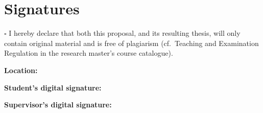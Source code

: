 \documentclass{article}
\begin{document}
\section*{Signatures}

\vspace{1.5em}

\noindent $\square$ I hereby declare that both this proposal, and its resulting thesis, will only contain original material and is free of plagiarism (cf.\ Teaching and Examination Regulation in the research master's course catalogue).

\vspace{4em}

\noindent
\begin{minipage}[t]{0.3\textwidth}
    \textbf{Location:}\\[3em]
\end{minipage}%
\hfill
\begin{minipage}[t]{0.32\textwidth}
    \textbf{Student's digital signature:}\\[3em]
    \makebox[\linewidth]{\dotfill}
\end{minipage}%
\hfill
\begin{minipage}[t]{0.32\textwidth}
    \textbf{Supervisor's digital signature:}\\[3em]
    \makebox[\linewidth]{\dotfill}
\end{minipage}
\end{document}
